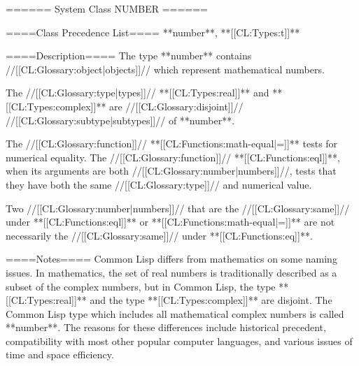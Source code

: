 ====== System Class NUMBER ======

====Class Precedence List==== 
**number**, **[[CL:Types:t]]**

====Description====
The type **number** contains //[[CL:Glossary:object|objects]]// which represent mathematical numbers.

The //[[CL:Glossary:type|types]]// **[[CL:Types:real]]** and **[[CL:Types:complex]]** are //[[CL:Glossary:disjoint]]// //[[CL:Glossary:subtype|subtypes]]// of **number**.

The //[[CL:Glossary:function]]// **[[CL:Functions:math-equal|=]]** tests for numerical equality. The //[[CL:Glossary:function]]// **[[CL:Functions:eql]]**, when its arguments are both //[[CL:Glossary:number|numbers]]//, tests that they have both the same //[[CL:Glossary:type]]// and numerical value.

Two //[[CL:Glossary:number|numbers]]// that are the //[[CL:Glossary:same]]// under **[[CL:Functions:eql]]** or **[[CL:Functions:math-equal|=]]** are not necessarily the //[[CL:Glossary:same]]// under **[[CL:Functions:eq]]**.

====Notes====
Common Lisp differs from mathematics on some naming issues. In mathematics, the set of real numbers is traditionally described as a subset of the complex numbers, but in Common Lisp, the type **[[CL:Types:real]]** and the type **[[CL:Types:complex]]** are disjoint. The Common Lisp type which includes all mathematical complex numbers is called **number**. The reasons for these differences include historical precedent, compatibility with most other popular computer languages, and various issues of time and space efficiency.

